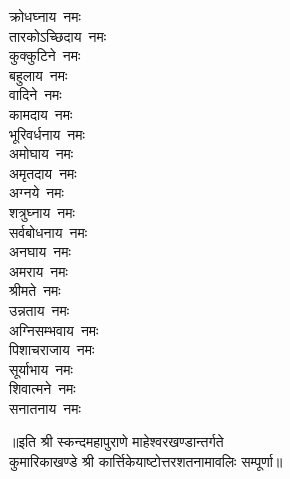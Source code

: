 \begin{multicols}{2}
\begin{flushleft}
क्रोधघ्नाय~नमः\\
तारकोऽच्छिदाय~नमः\\
कुक्कुटिने~नमः\hfill{}\\
बहुलाय~नमः\\
वादिने~नमः\\
कामदाय~नमः\\
भूरिवर्धनाय~नमः\\
अमोघाय~नमः\\
अमृतदाय~नमः\\
अग्नये~नमः\\
शत्रुघ्नाय~नमः\\
सर्वबोधनाय~नमः\\
अनघाय~नमः\hfill{}\\
अमराय~नमः\\
श्रीमते~नमः\\
उन्नताय~नमः\\
अग्निसम्भवाय~नमः\\
पिशाचराजाय~नमः\\
सूर्याभाय~नमः\\
शिवात्मने~नमः\\
सनातनाय~नमः\\
\end{flushleft}
\end{multicols}
॥इति श्री स्कन्दमहापुराणे माहेश्वरखण्डान्तर्गते\\ कुमारिकाखण्डे श्री कार्त्तिकेयाष्टोत्तरशतनामावलिः सम्पूर्णा॥

